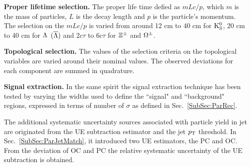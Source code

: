 \textbf{Proper lifetime selection.} The proper life time defied as $mLc/p$, which $m$ is the mass of particles, $L$ is the decay length and $p$ is the particle's momentum. The selection on the $mLc/p$ is varied from around 12 cm to 40 cm for ${\rm K}^{0}_{\rm{S}}$, 20 cm to 40 cm for $\Lambda$ $(\overline{\Lambda})$ and 2$c\tau$ to 6$c\tau$ for $\Xi^{\pm}$ and $\Omega^{\pm}$.

\textbf{Topological selection.} The values of the selection criteria on the topological variables are varied around their nominal values. The observed deviations for each component are summed in quadrature.

\textbf{Signal extraction.} In the same spirit the signal extraction technique has been tested by varying the widths used to define the ``signal" and ``background" regions, expressed in terms of number of $\sigma$ as defined in Sec.~\ref{SubSec:ParRec}.

The additional systematic uncertainty sources associated with particle yield in jet are originated from the UE subtraction estimator and the jet $p_{\rm T}$ threshold. In Sec.~\ref{SubSec:ParJetMatch}, it introduced two UE estimators, the PC and OC. From the deviation of OC and PC the relative systematic uncertainty of the UE subtraction is obtained. 
 

